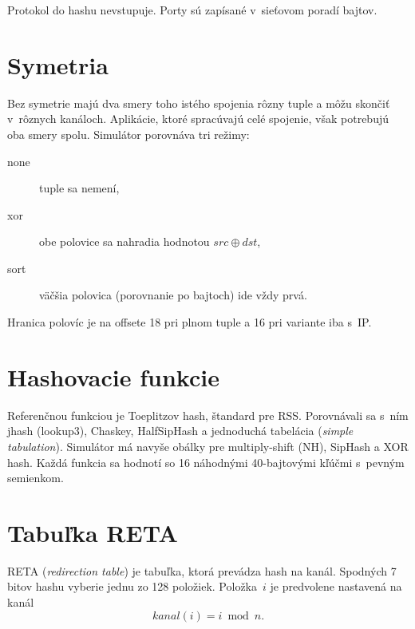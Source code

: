 Protokol do hashu nevstupuje. Porty sú zapísané v~sieťovom poradí bajtov.

\section{Symetria}
\label{sec:symetria}

Bez symetrie majú dva smery toho istého spojenia rôzny tuple a môžu skončiť v~rôznych
kanáloch. Aplikácie, ktoré spracúvajú celé spojenie, však potrebujú oba smery spolu.
Simulátor porovnáva tri režimy:

\begin{description}
  \item[none] tuple sa nemení,
  \item[xor] obe polovice sa nahradia hodnotou $\mathit{src} \oplus \mathit{dst}$,
  \item[sort] väčšia polovica (porovnanie po bajtoch) ide vždy prvá.
\end{description}

Hranica polovíc je na offsete 18 pri plnom tuple a 16 pri variante iba s~IP.

\section{Hashovacie funkcie}
\label{sec:hashe}

Referenčnou funkciou je Toeplitzov hash, štandard pre RSS. Porovnávali sa s~ním
jhash (lookup3), Chaskey, HalfSipHash a jednoduchá tabelácia (\emph{simple tabulation}).
Simulátor má navyše obálky pre multiply-shift (NH), SipHash a XOR hash.
Každá funkcia sa hodnotí so 16 náhodnými 40-bajtovými kľúčmi s~pevným semienkom.


\section{Tabuľka RETA}
\label{sec:reta}

RETA (\emph{redirection table}) je tabuľka, ktorá prevádza hash na kanál. Spodných
7 bitov hashu vyberie jednu zo 128 položiek. Položka~$i$ je predvolene nastavená na kanál
\begin{equation}
  \mathit{kanal}(i) = i \bmod n .
\end{equation}

